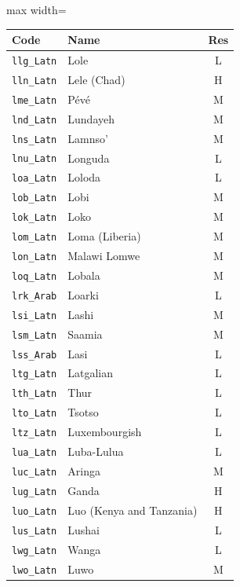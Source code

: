 {
    \tiny\renewcommand{\arraystretch}{.8}
    \begin{adjustbox}{max width=\textwidth}
    \begin{tabular}{llc}
        \toprule
        \textbf{Code} & \textbf{Name} & \textbf{Res}\\
        \midrule
        \texttt{llg\_Latn} & Lole & L \\
        \texttt{lln\_Latn} & Lele (Chad) & H \\
        \texttt{lme\_Latn} & Pévé & M \\
        \texttt{lnd\_Latn} & Lundayeh & M \\
        \texttt{lns\_Latn} & Lamnso' & M \\
        \texttt{lnu\_Latn} & Longuda & L \\
        \texttt{loa\_Latn} & Loloda & L \\
        \texttt{lob\_Latn} & Lobi & M \\
        \texttt{lok\_Latn} & Loko & M \\
        \texttt{lom\_Latn} & Loma (Liberia) & M \\
        \texttt{lon\_Latn} & Malawi Lomwe & M \\
        \texttt{loq\_Latn} & Lobala & M \\
        \texttt{lrk\_Arab} & Loarki & L \\
        \texttt{lsi\_Latn} & Lashi & M \\
        \texttt{lsm\_Latn} & Saamia & M \\
        \texttt{lss\_Arab} & Lasi & L \\
        \texttt{ltg\_Latn} & Latgalian & L \\
        \texttt{lth\_Latn} & Thur & L \\
        \texttt{lto\_Latn} & Tsotso & L \\
        \texttt{ltz\_Latn} & Luxembourgish & L \\
        \texttt{lua\_Latn} & Luba-Lulua & L \\
        \texttt{luc\_Latn} & Aringa & M \\
        \texttt{lug\_Latn} & Ganda & H \\
        \texttt{luo\_Latn} & Luo (Kenya and Tanzania) & H \\
        \texttt{lus\_Latn} & Lushai & L \\
        \texttt{lwg\_Latn} & Wanga & L \\
        \texttt{lwo\_Latn} & Luwo & M \\

\end{tabular}
\end{adjustbox}}
